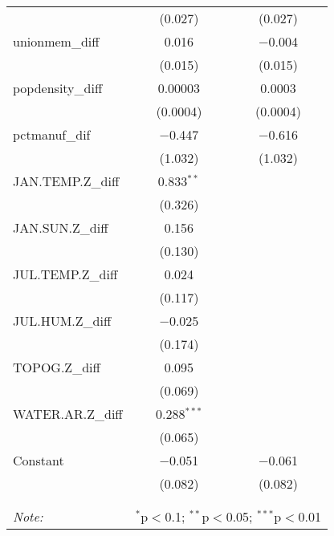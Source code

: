 \begin{table}[!htbp]
\begin{tabular}{@{\extracolsep{5pt}}lcc}
  & (0.027) & (0.027) \\ 
  unionmem\_diff & 0.016 & $-$0.004 \\ 
  & (0.015) & (0.015) \\ 
  popdensity\_diff & 0.00003 & 0.0003 \\ 
  & (0.0004) & (0.0004) \\ 
  pctmanuf\_dif & $-$0.447 & $-$0.616 \\ 
  & (1.032) & (1.032) \\ 
  JAN.TEMP.Z\_diff & 0.833$^{**}$ &  \\ 
  & (0.326) &  \\ 
  JAN.SUN.Z\_diff & 0.156 &  \\ 
  & (0.130) &  \\ 
  JUL.TEMP.Z\_diff & 0.024 &  \\ 
  & (0.117) &  \\ 
  JUL.HUM.Z\_diff & $-$0.025 &  \\ 
  & (0.174) &  \\ 
  TOPOG.Z\_diff & 0.095 &  \\ 
  & (0.069) &  \\ 
  WATER.AR.Z\_diff & 0.288$^{***}$ &  \\ 
  & (0.065) &  \\ 
  Constant & $-$0.051 & $-$0.061 \\ 
  & (0.082) & (0.082) \\ 
 \hline \\[-1.8ex] 
\hline 
\hline \\[-1.8ex] 
\textit{Note:}  & \multicolumn{2}{r}{$^{*}$p$<$0.1; $^{**}$p$<$0.05; $^{***}$p$<$0.01} \\ 
\end{tabular} 
\end{table} 

